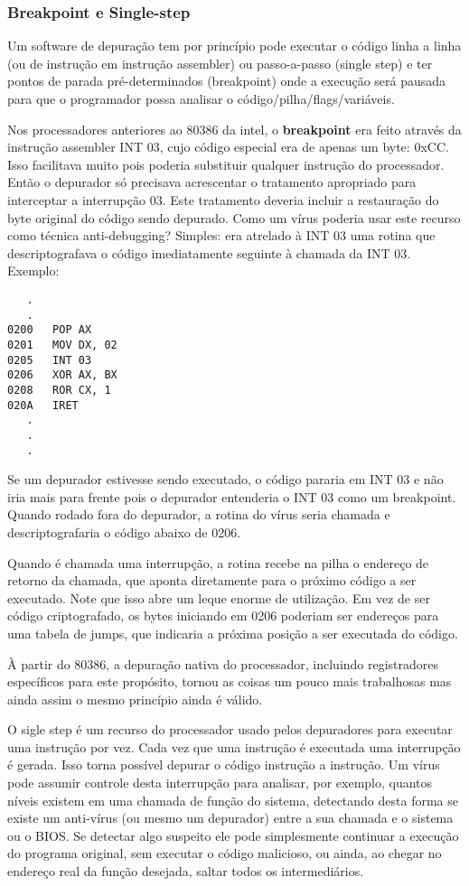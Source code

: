 \subsubsection{Breakpoint e Single-step}
Um software de depuração tem por princípio pode executar o código linha a linha (ou de instrução em instrução assembler) ou passo-a-passo (single step) e ter pontos de parada pré-determinados (breakpoint) onde a execução será pausada para que o programador possa analisar o código/pilha/flags/variáveis. 

Nos processadores anteriores ao 80386\cite[Cap. 12]{ludvig:1} da intel, o \textbf{breakpoint} era feito através da instrução assembler INT 03, cujo código especial era de apenas um byte: 0xCC. Isso facilitava muito pois poderia substituir qualquer instrução do processador. Então o depurador só precisava acrescentar o tratamento apropriado para interceptar a interrupção 03. Este tratamento deveria incluir a restauração do byte original do código sendo depurado. Como um vírus poderia usar este recurso como técnica anti-debugging? Simples: era atrelado à INT 03 uma rotina que descriptografava o código imediatamente seguinte à chamada da INT 03. Exemplo:

{{{
\renewcommand{\baselinestretch}{1.0}
\begin{verbatim}
   .
   .
0200   POP AX
0201   MOV DX, 02
0205   INT 03
0206   XOR AX, BX
0208   ROR CX, 1
020A   IRET
   .
   .
   .
\end{verbatim}
}}}

Se um depurador estivesse sendo executado, o código pararia em INT 03 e não iria mais para frente pois o depurador entenderia o INT 03 como um breakpoint. Quando rodado fora do depurador, a rotina do vírus seria chamada e descriptografaria o código abaixo de 0206. 

Quando é chamada uma interrupção, a rotina recebe na pilha o endereço de retorno da chamada, que aponta diretamente para o próximo código a ser executado. Note que isso abre um leque enorme de utilização. Em vez de ser código criptografado, os bytes iniciando em 0206 poderiam ser endereços para uma tabela de jumps, que indicaria a próxima posição a ser executada do código.

À partir do 80386, a depuração nativa do processador, incluindo registradores específicos para este propósito, tornou as coisas um pouco mais trabalhosas mas ainda assim o mesmo princípio ainda é válido.

O sigle step é um recurso do processador usado pelos depuradores para executar uma instrução por vez. Cada vez que uma instrução é executada uma interrupção é gerada. Isso torna possível depurar o código instrução a instrução. Um vírus pode assumir controle desta interrupção para analisar, por exemplo, quantos níveis existem em uma chamada de função do sistema, detectando desta forma se existe um anti-vírus (ou mesmo um depurador) entre a sua chamada e o sistema ou o BIOS. Se detectar algo suspeito ele pode simplesmente continuar a execução do programa original, sem executar o código malicioso, ou ainda, ao chegar no endereço real da função desejada, saltar todos os intermediários.

